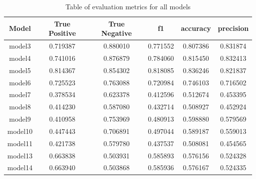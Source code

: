 \begin{table}
    \centering
    \begin{tabular}{c c c c c c} 
         \toprule
         Model & True Positive & True Negative & f1 & accuracy & precision\\
         \midrule
         model3 & 0.719387 & 0.880010 & 0.771552 & 0.807386 & 0.831874\\
         model4 & 0.741016 & 0.876879 & 0.784060 & 0.815450 & 0.832413\\ 
         model5 & 0.814367 & 0.854302 & 0.818085 & 0.836246 & 0.821837\\
         model6 & 0.725523 & 0.763088 & 0.720984 & 0.746103 & 0.716502\\
         model7 & 0.378534 & 0.623378 & 0.412596 & 0.512674 & 0.453395\\
         model8 & 0.414230 & 0.587080 & 0.432714 & 0.508927 & 0.452924\\
         model9 & 0.410958 & 0.753969 & 0.480913 & 0.598880 & 0.579569\\
         model10 & 0.447443 & 0.706891 & 0.497044 & 0.589187 & 0.559013\\
         model11 & 0.421738 & 0.579780 & 0.437537 & 0.508081 & 0.454565\\
         model13 & 0.663838 & 0.503931 & 0.585893 & 0.576156 & 0.524328\\
         model14 & 0.663940 & 0.503868 & 0.585936 & 0.576167 & 0.524335\\
         \bottomrule
    \end{tabular}
    \caption{Table of evaluation metrics for all models}
    \label{tbl:x model_evals}
\end{table}